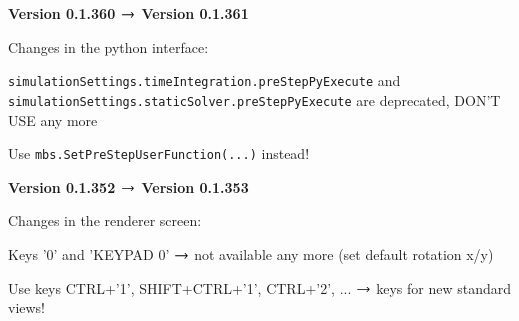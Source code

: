 	\ei
	\item {\bf Version 0.1.360 $\rightarrow$ Version 0.1.361}
	\item[] Changes in the python interface:
	\bi \ttfamily
	  \item \texttt{simulationSettings.timeIntegration.preStepPyExecute} and \\
		\texttt{simulationSettings.staticSolver.preStepPyExecute}
		are deprecated, DON'T USE any more
	  \item Use \texttt{mbs.SetPreStepUserFunction(...)} instead!
	\ei
	\item {\bf Version 0.1.352 $\rightarrow$ Version 0.1.353}
	\item[] Changes in the renderer screen:
	\bi \ttfamily
	  \item Keys '0' and 'KEYPAD 0' $\rightarrow$ not available any more (set default rotation x/y)
	  \item Use keys CTRL+'1', SHIFT+CTRL+'1', CTRL+'2', ...  $\rightarrow$ keys for new standard views!
	\ei

